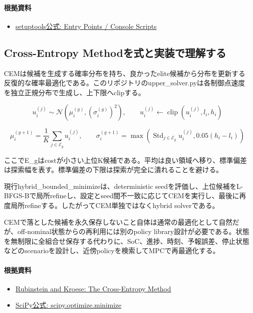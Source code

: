 \documentclass[a4paper,11pt]{article}
\begin{document}
\paragraph{根拠資料}
\begin{itemize}[leftmargin=1.6em]
\item \href{https://setuptools.pypa.io/en/latest/userguide/entry_point.html}{setuptools公式: Entry Points / Console Scripts}
\end{itemize}

\subsection{Cross-Entropy Methodを式と実装で理解する}
CEMは候補を生成する確率分布を持ち、良かったelite候補から分布を更新する反復的な確率最適化である。このリポジトリのupper\_solver.pyは各制御点速度を独立正規分布で生成し、上下限へclipする。


\[
u_i^{(j)} \sim \mathcal{N}(\mu_i^{(g)},(\sigma_i^{(g)})^2),\qquad u_i^{(j)}\leftarrow\operatorname{clip}(u_i^{(j)},l_i,h_i)
\]

\[
\mu_i^{(g+1)}=\frac{1}{K}\sum_{j\in\mathcal{E}_g}u_i^{(j)},\qquad \sigma_i^{(g+1)}=\max\left(\operatorname{Std}_{j\in\mathcal{E}_g}u_i^{(j)},0.05(h_i-l_i)\right)
\]

ここでE\_gはcostが小さい上位K候補である。平均は良い領域へ移り、標準偏差は探索幅を表す。標準偏差の下限は探索が完全に潰れることを避ける。


現行hybrid\_bounded\_minimizeは、deterministic seedを評価し、上位候補をL-BFGS-Bで局所refineし、設定とseed間不一致に応じてCEMを実行し、最後に再度局所refineする。したがってCEM単独ではなくhybrid solverである。


CEMで落とした候補を永久保存しないこと自体は通常の最適化として自然だが、off-nominal状態からの再利用には別のpolicy library設計が必要である。状態を無制限に全組合せ保存する代わりに、SoC、進捗、時刻、予報誤差、停止状態などのscenarioを設計し、近傍policyを検索してMPCで再最適化する。

\paragraph{根拠資料}
\begin{itemize}[leftmargin=1.6em]
\item \href{https://link.springer.com/book/10.1007/978-1-4757-4321-0}{Rubinstein and Kroese: The Cross-Entropy Method}
\item \href{https://docs.scipy.org/doc/scipy/reference/generated/scipy.optimize.minimize.html}{SciPy公式: scipy.optimize.minimize}
\end{itemize}
\end{document}
